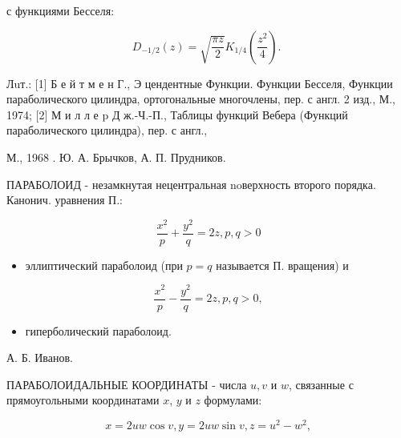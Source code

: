 \documentclass[10pt]{article}
\begin{document}
с функциями Бесселя:



\[

D_{-1 / 2}(z)=\sqrt{\frac{\pi z}{2}} K_{1 / 4}\left(\frac{z^{2}}{4}\right) \text {. }

\]



Лuт.: [1] Б е й т м е н Г., Э цендентные Функции. Функции Бесселя, Функции параболического цилиндра, ортогональные многочлены, пер. с англ. 2 изд., М., 1974; [2] М и л л е p Д ж.-Ч.-П., Таблицы функций Вебера (Функций параболического цилиндра), пер. с англ.,



М., 1968 . Ю. А. Брычков, А. П. Прудников.



ПАРАБОЛОИД - незамкнутая нецентральная noверхность второго порядка. Канонич. уравнения П.:



\[

\frac{x^{2}}{p}+\frac{y^{2}}{q}=2 z, p, q>0

\]



\begin{itemize}

  \item эллиптический параболоид (при $p=q$ называется П. вращения) и

\end{itemize}



\[

\frac{x^{2}}{p}-\frac{y^{2}}{q}=2 z, p, q>0,

\]



\begin{itemize}

  \item гиперболический параболоид.

\end{itemize}



А. Б. Иванов.



ПАРАБОЛОИДАЛЬНЫЕ КООРДИНАТЫ - числа $u, v$ и $w$, связанные с прямоугольными координатами $x$, $y$ и $z$ формулами:



\[

x=2 u w \cos v, y=2 u w \sin v, z=u^{2}-w^{2},

\]
\end{document}

